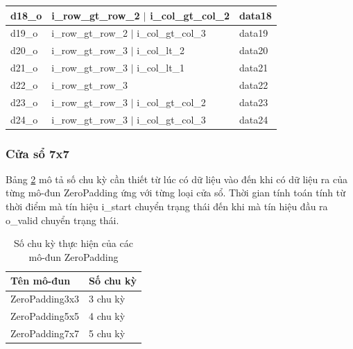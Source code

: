 \begin{table}[!ht]
\begin{tabular}{|p{2.2cm} p{7cm} p{4cm}|}
      d18\_o & i\_row\_gt\_row\_2 $\vert$ i\_col\_gt\_col\_2 & data18 \\ \hline
      d19\_o & i\_row\_gt\_row\_2 $\vert$ i\_col\_gt\_col\_3 & data19 \\ \hline
      d20\_o & i\_row\_gt\_row\_3 $\vert$ i\_col\_lt\_2     & data20 \\ \hline
      d21\_o & i\_row\_gt\_row\_3 $\vert$ i\_col\_lt\_1     & data21 \\ \hline
      d22\_o & i\_row\_gt\_row\_3                           & data22 \\ \hline
      d23\_o & i\_row\_gt\_row\_3 $\vert$ i\_col\_gt\_col\_2 & data23 \\ \hline
      d24\_o & i\_row\_gt\_row\_3 $\vert$ i\_col\_gt\_col\_3 & data24 \\ \hline
    \end{tabular}

    \label{tab:conditionForOutputZero5x5}
\end{table}

\newpage
\subsubsection{Cửa sổ 7x7}
Bảng \ref{tab:numberOfCycleZeroPadding} mô tả số chu kỳ cần thiết từ lúc có dữ liệu vào đến khi có dữ liệu ra của từng mô-đun ZeroPadding ứng với từng loại cửa sổ. Thời gian tính toán tính từ thời điểm mà tín hiệu i\_start chuyển trạng thái đến khi mà tín hiệu đầu ra o\_valid chuyển trạng thái.
\begin{table}[H]
	\centering
	\renewcommand{\arraystretch}{1.3}
		\caption{Số chu kỳ thực hiện của các mô-đun ZeroPadding}
	\begin{tabular}{|p{5cm} p{5cm} |}
		\hline
		\rowcolor{gray!30}
		\textbf{Tên mô-đun} & \textbf{Số chu kỳ}  \\
		\hline
		ZeroPadding3x3  & 3 chu kỳ
		\\ \hline
		ZeroPadding5x5 & 4 chu kỳ
		\\ \hline
		ZeroPadding7x7 & 5 chu kỳ
		\\ \hline
	\end{tabular}

	\label{tab:numberOfCycleZeroPadding}
\end{table}


